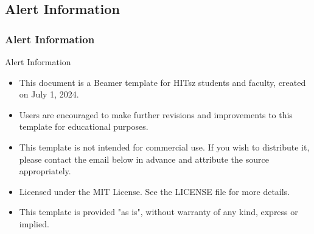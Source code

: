 \documentclass{beamer}
\begin{document}
\subsection{Alert Information}
\begin{frame}
\frametitle{Alert Information}
\begin{alertblock}{Alert Information}
  \begin{itemize}
    \item This document is a Beamer template for HITsz students and faculty, created on July 1, 2024.
    \item Users are encouraged to make further revisions and improvements to this template for educational purposes.
    \item This template is not intended for commercial use. If you wish to distribute it, please contact the email below in advance and attribute the source appropriately.
    \item Licensed under the MIT License. See the LICENSE file for more details.
    \item This template is provided "as is", without warranty of any kind, express or implied.
  \end{itemize}
\end{alertblock}
\end{frame}



\end{document}
